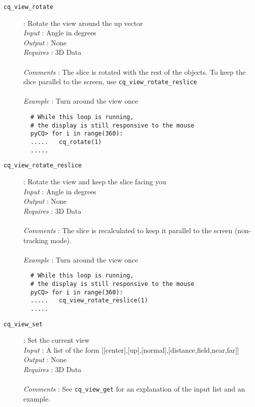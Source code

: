 \documentclass[a4paper,notitlepage,11pt]{article}
\begin{document}
\begin{description}
\item[\texttt{cq\_view\_rotate}]: Rotate the view around the up vector \\
  \emph{Input} : Angle in degrees\\
  \emph{Output} : None\\
  \emph{Requires} : 3D Data\\
  \\
  \emph{Comments} : The slice is rotated with the rest of the objects. To keep the slice parallel to the screen, use 
  \texttt{cq\_view\_rotate\_reslice}\\
  \\
  \emph{Example} : Turn around the view once
  \begin{verbatim}
  # While this loop is running, 
  # the display is still responsive to the mouse
  pyCQ> for i in range(360):
  .....   cq_rotate(1)
  .....
  \end{verbatim}
\end{description}

\begin{description}
\item[\texttt{cq\_view\_rotate\_reslice}]: Rotate the view and keep the slice facing you \\
  \emph{Input} : Angle in degrees\\
  \emph{Output} : None\\
  \emph{Requires} : 3D Data\\
  \\
  \emph{Comments} : The slice is recalculated to keep it parallel to the screen (non-tracking mode).\\
  \\
  \emph{Example} : Turn around the view once
  \begin{verbatim}
  # While this loop is running,
  # the display is still responsive to the mouse
  pyCQ> for i in range(360):
  .....   cq_view_rotate_reslice(1)
  .....
  \end{verbatim}
\end{description}

\begin{description}
\item[\texttt{cq\_view\_set}]: Set the current view \\
  \emph{Input} : A list of the form [[center],[up],[normal],[distance,field,near,far]]\\
  \emph{Output} : None\\
  \emph{Requires} : 3D Data\\
  \\
  \emph{Comments} : See \texttt{cq\_view\_get} for an explanation of the input list and an example.
\end{description}
\end{document}
